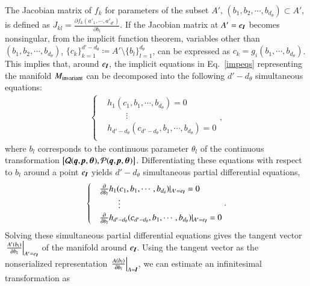 \documentclass[preprint,
bibnotes,
 amsmath,amssymb,
 aps,
]{revtex4-1}
\begin{document}
The Jacobian matrix of $f_k$ for parameters of the subset $A'$, $(b_1,b_2,\cdots,b_{d_{\theta}})\subset A'$, is defined as $J_{kl} = \frac{\partial{f_k(a'_1,\cdots,a'_{d'})}}{\partial b_l}$. 
If the Jacobian matrix at $A' = e_{\textit{\textbf{I}}}$ becomes nonsingular, from the implicit function theorem, variables other than $(b_1,b_2,\cdots,b_{d_{\theta}})$, $\{c_{k}\}_{k=1}^{d'-{d_{\theta}}} \coloneqq  A' \setminus \{b_{l}\}_{l=1}^{d_{\theta}}$, can be expressed as 
$c_k = g_{i}(b_1,\cdots,b_{d_{\theta}})$. 
This implies that, around $e_{\textit{\textbf{I}}}$, the implicit equations in Eq.~\eqref{impeqs} representing the manifold $M_{{\rm invariant}}$ can be decomposed into the following $d'-d_{\theta}$ simultaneous equations:
\begin{eqnarray}
  \begin{cases}
  \label{simul_eq}
&h_{1}(c_1,b_1,\cdots,b_{d_{\theta}})=0\\
&\:\:\:\:\:\:\:\:\:\: \vdots\\
&h_{d'-{d_{\theta}}}(c_{d'-d_{\theta}},b_1,\cdots,b_{d_{\theta}})=0\\
  \end{cases},
\end{eqnarray}
where $b_l$ corresponds to the continuous parameter $\theta_l$ of the continuous transformation $\left[\mathbf{\mathcal{Q}}(\textit{\textbf{q}},\textit{\textbf{p}}, \boldsymbol{\theta}),\mathbf{\mathcal{P}}(\textit{\textbf{q}},\textit{\textbf{p}}, \boldsymbol{\theta})\right]$. 
Differentiating these equations with respect to $b_l$ around a point $e_{\textit{\textbf{I}}}$ yields $d'-d_{\theta}$ simultaneous partial differential equations,
\begin{eqnarray}
\label{diff_eq}
  \begin{cases}
\label{partial_eq}
&\frac{\partial}{\partial b_l}h_{1}(c_1,b_1,\cdots,b_{d_{\theta}})|_{A'=e_{\textit{\textbf{I}}}} = 0\\
&\:\:\:\:\:\:\:\:\:\: \vdots\\
&\frac{\partial}{\partial b_l}h_{d'-d_{\theta}}(c_{d'-d_{\theta}},b_1,\cdots,b_{d_{\theta}})|_{A'=e_{\textit{\textbf{I}}}} = 0\\
  \end{cases}.
\end{eqnarray}
Solving these simultaneous partial differential equations gives the tangent vector $\left.\frac{A'(b_l)}{\partial b_l}\right|_{A'=e_{\textit{\textbf{I}}}}$ of the manifold around $e_{\textit{\textbf{I}}}$. 
Using the tangent vector as the nonserialized representation $\left.\frac{A(b_l)}{\partial b_l}\right|_{A=\textit{\textbf{I}}}$, we can estimate an infinitesimal transformation as
\end{document}
